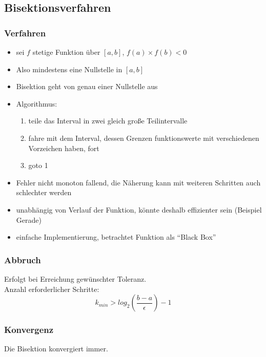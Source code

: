 \documentclass[a4paper, 12pt]{article}
\begin{document}
\subsection{Bisektionsverfahren}

\subsubsection*{Verfahren}
\begin{itemize}
  \item sei \(f\) stetige Funktion über \([a,b]\), \(f(a)\times f(b)<0\)
  \item Also mindestens eine Nullstelle in \([a,b]\)
  \item Bisektion geht von genau einer Nullstelle aus
  \item Algorithmus:
    \begin{enumerate}
      \item teile das Interval in zwei gleich große Teilintervalle
      \item fahre mit dem Interval, dessen Grenzen funktionswerte mit verschiedenen Vorzeichen haben, fort
      \item goto 1
    \end{enumerate}
\end{itemize}
\begin{itemize}
  \renewcommand{\labelitemi}{\(-\)}%
  \item Fehler nicht monoton fallend, die Näherung kann mit weiteren Schritten auch schlechter werden
  \item unabhängig von Verlauf der Funktion, könnte deshalb effizienter sein (Beispiel Gerade)
\end{itemize}
\begin{itemize}
  \renewcommand{\labelitemi}{+}%
  \item einfache Implementierung, betrachtet Funktion als ``Black Box''
\end{itemize}

\subsubsection*{Abbruch}
Erfolgt bei Erreichung gewünschter Toleranz.\\
Anzahl erforderlicher Schritte:
\[k_{min} > log_2(\frac{b-a}{\epsilon})-1\]

\subsubsection*{Konvergenz}
Die Bisektion konvergiert immer.
\end{document}
